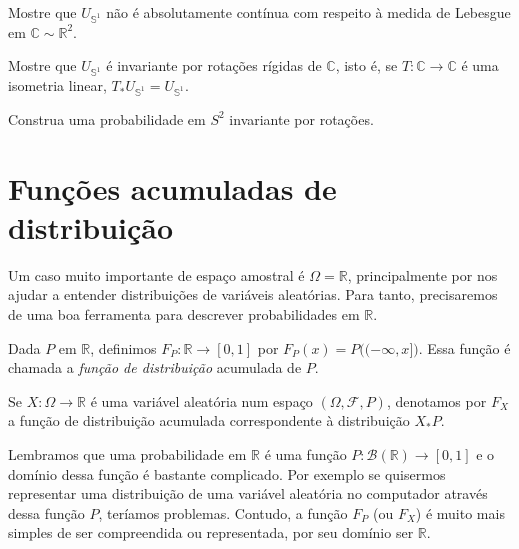 \begin{exercise}
  Mostre que $U_{\mathbb{S}^1}$ não é absolutamente contínua com respeito à medida de Lebesgue em $\mathbb{C} \sim \mathbb{R}^2$.
\end{exercise}

\begin{exercise}
  Mostre que $U_{\mathbb{S}^1}$ é invariante por rotações rígidas de $\mathbb{C}$, isto é, se $T:\mathbb{C} \to \mathbb{C}$ é uma isometria linear,
  $T_*U_{\mathbb{S}^1}=U_{\mathbb{S}^1}$.
\end{exercise}

\begin{exercise}
  Construa uma probabilidade em $S^2$ invariante por rotações.
\end{exercise}

\section{Funções acumuladas de distribuição}

Um caso muito importante de espaço amostral é $\Omega = \mathbb{R}$, principalmente por nos ajudar a entender distribuições de variáveis aleatórias.
Para tanto, precisaremos de uma boa ferramenta para descrever probabilidades em $\mathbb{R}$.

\begin{definition}
  Dada $P$ em $\mathbb{R}$, definimos $F_P:\mathbb{R} \to [0,1]$ por $F_P(x) = P\big((-\infty, x]\big)$.
  Essa função é chamada a \emph{função de distribuição} acumulada de $P$. 
\end{definition}

\begin{notation}
  Se $X:\Omega \to \mathbb{R}$ é uma variável aleatória num espaço $(\Omega, \mathcal{F}, P)$, denotamos por $F_X$ 
  a função de distribuição acumulada correspondente à distribuição $X_*P$.
\end{notation}

Lembramos que uma probabilidade em $\mathbb{R}$ é uma função $P:\mathcal{B}(\mathbb{R}) \to [0,1]$ e o domínio dessa função é bastante complicado.
Por exemplo se quisermos representar uma distribuição de uma variável aleatória no computador através dessa função $P$, teríamos problemas.
Contudo, a função $F_P$ (ou $F_X$) é muito mais simples de ser compreendida ou representada, por seu domínio ser $\mathbb{R}$.

